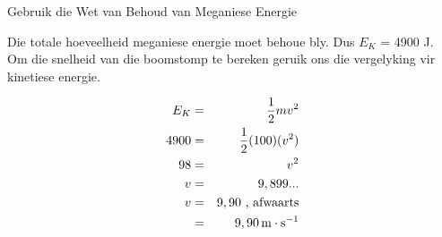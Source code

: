 \begin{wex}{Gebruik die Wet van Behoud van Meganiese Energie}
{
Die totale hoeveelheid meganiese energie moet behoue bly. Dus $E_{K}$ = 4900 J.\\

Om die snelheid van die boomstomp te bereken geruik ons die vergelyking vir kinetiese energie.

\begin{eqnarray*}
E_{K} & = & \frac{1}{2}mv^2 \\
4900 &=& \frac{1}{2} (100) (v^2) \\
98 &=& v^2\\
v &=& 9,899...\\
v &=& 9,90 \ \text{, afwaarts}\\
&=&9,90 \,\text{m} \cdot \text{s}^{-1}
\end{eqnarray*}}
\end{wex}
    \noindent
\par
            \label{m38786*secfhsst!!!underscore!!!id2130}\vspace{.5cm} 
      \noindent
